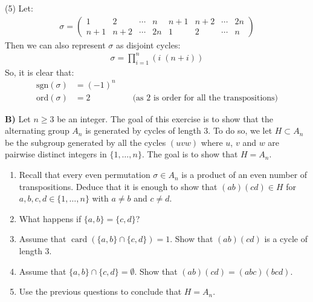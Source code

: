 \documentclass[12pt,a4paper]{article}
\begin{document}
\newpage
\noindent
(5) Let:
\begin{align*}
  \sigma = \begin{pmatrix}
1&2&\cdots&n&n+1&n+2&\cdots&2n\\
n+1&n+2&\cdots&2n&1&2&\cdots&n
\end{pmatrix}
\end{align*}
Then we can also represent $\sigma$ as disjoint cycles:
\begin{align*}
  \sigma = \prod_{i=1}^n (i \; (n+i))
\end{align*}
So, it is clear that:
\begin{align*}
  \text{sgn}(\sigma) &= (-1)^n \\
  \text{ord}(\sigma) &= 2 \;\;\;\;\;\;\;\;\;\;\;\;\;\;\;\;\;\; \text{(as 2 is order for all the transpositions)}
\end{align*}

\newpage
\noindent\textbf{B)} Let $n\geq 3$ be an integer. The goal of this exercise is to show that the alternating group $A_n$ is generated by cycles of length $3$. To do so, we let $H\subset A_n$ be the subgroup generated by all the cycles $(uvw)$ where $u$, $v$ and $w$ are pairwise distinct integers in $\{1,\ldots,n\}$. The goal is to show that $H=A_n$.
\begin{enumerate}
\renewcommand{\labelenumi}{(\arabic{enumi})}
\item Recall that every even permutation $\sigma\in A_n$ is a product of an even number of transpositions. Deduce that it is enough to show that $(ab)(cd)\in H$ for $a,b,c,d\in\{1,\ldots,n\}$ with $a\neq b$ and $c\neq d$.
\item What happens if $\{a,b\}=\{c,d\}$?
\item Assume that $\operatorname{card}(\{a,b\}\cap\{c,d\})=1$. Show that $(ab)(cd)$ is a cycle of length $3$.
\item Assume that $\{a,b\}\cap\{c,d\}=\emptyset$. Show that $(ab)(cd)=(abc)(bcd)$.
\item Use the previous questions to conclude that $H=A_n$.
\end{enumerate}
\end{document}
